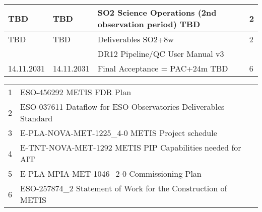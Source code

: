 \begin{table}
\begin{tabularx}{\textwidth}{llll}
\hline
TBD        &	TBD        &	SO2 Science Operations (2nd observation period) TBD	    &	2 \\
\hline
TBD        &	TBD        &	Deliverables SO2+8w                                         &	2 \\
	   &		   &	DR12 Pipeline/QC User Manual v3				    &	\\
\hline
14.11.2031 &	14.11.2031 &	Final Acceptance  = PAC+24m  TBD			    &	6 \\
\hline\hline
\end{tabularx}			
\tiny
\begin{tabularx}{\textwidth}{ll}
1 & ESO-456292 METIS FDR Plan  \\
2 & ESO-037611 Dataflow for ESO Observatories Deliverables Standard \\
3 & E-PLA-NOVA-MET-1225_4-0 METIS Project schedule \\
4 & E-TNT-NOVA-MET-1292 METIS PIP Capabilities needed for AIT \\ 
5 & E-PLA-MPIA-MET-1046_2-0 Commissioning Plan \\
6 & ESO-257874_2 Statement of Work for the Construction of METIS \\
\end{tabularx} 



\end{table}

